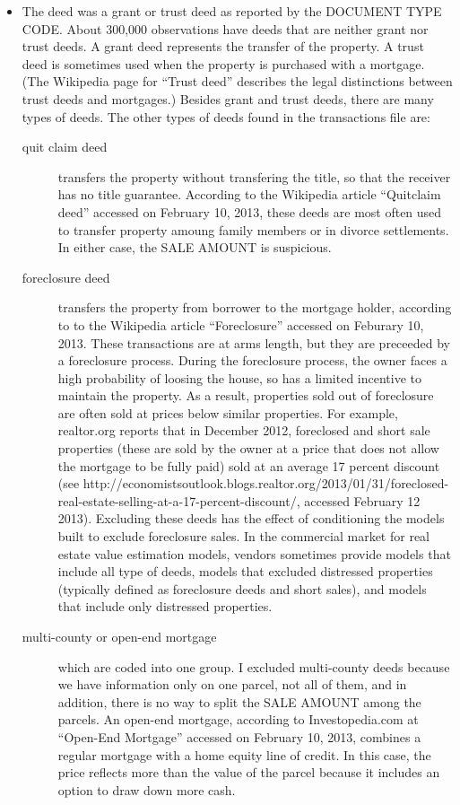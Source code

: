\begin{itemize}
\item The deed was a grant or trust deed as reported by the DOCUMENT
  TYPE CODE. About 300,000 observations have deeds that are neither
  grant nor trust deeds. A grant deed represents the transfer of the
  property. A trust deed is sometimes used when the property is
  purchased with a mortgage. (The Wikipedia page for ``Trust deed''
  describes the legal distinctions between trust deeds and mortgages.)
  Besides grant and trust deeds, there are many types of deeds. The
  other types of deeds found in the transactions file are:
  \begin{description}
  \item[quit claim deed] transfers the property without transfering
    the title, so that the receiver has no title guarantee. According
    to the Wikipedia article ``Quitclaim deed'' accessed on February
    10, 2013, these deeds are most often used to transfer property
    amoung family members or in divorce settlements. In either case,
    the SALE AMOUNT is suspicious.

  \item[foreclosure deed] transfers the property from borrower to the mortgage
    holder, according to to the Wikipedia article
    ``Foreclosure'' accessed on Feburary 10, 2013. These transactions
    are at arms length, but they are preceeded by a foreclosure
    process. During the foreclosure process, the owner faces a high
    probability of loosing the house, so has a limited incentive to
    maintain the property. As a result, properties sold out of
    foreclosure are often sold at prices below similar properties. For
    example, realtor.org reports that in December 2012, foreclosed and
    short sale properties (these are sold by the owner at a price that
    does not allow the mortgage to be fully paid) sold at an average
    17 percent discount (see
    http://economistsoutlook.blogs.realtor.org/2013/01/31/foreclosed-real-estate-selling-at-a-17-percent-discount/,
    accessed February 12 2013).  Excluding these deeds has the effect
    of conditioning the models built to exclude foreclosure sales. In
    the commercial market for real estate value estimation models,
    vendors sometimes provide models that include all type of deeds,
    models that excluded distressed properties (typically defined as
    foreclosure deeds and short sales), and models that include only
    distressed properties.

  \item[multi-county or open-end mortgage] which are coded into one
    group. I excluded multi-county deeds because we have information
    only on one parcel, not all of them, and in addition, there is no
    way to split the SALE AMOUNT among the parcels. An open-end
    mortgage, according to Investopedia.com at ``Open-End Mortgage''
    accessed on February 10, 2013, combines a regular mortgage with a
    home equity line of credit. In this case, the price reflects more
    than the value of the parcel because it includes an option to draw
    down more cash.


\end{description}
\end{itemize}
